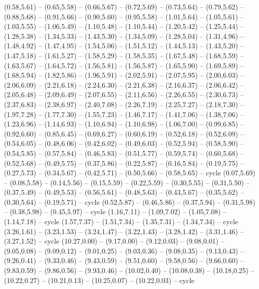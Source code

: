 \expandafter\def\csname geo:gebiet:heute-NLD\endcsname{
  (0.58,5.61) -- (0.65,5.58) -- (0.66,5.67) -- (0.72,5.69) -- (0.73,5.64) -- (0.79,5.62) -- (0.88,5.68) -- (0.91,5.66) -- (0.90,5.60) -- (0.95,5.58) -- (1.01,5.64) -- (1.05,5.61) -- (1.03,5.55) -- (1.06,5.49) -- (1.10,5.48) -- (1.10,5.44) -- (1.20,5.42) -- (1.25,5.44) -- (1.28,5.38) -- (1.34,5.33) -- (1.43,5.30) -- (1.34,5.09) -- (1.28,5.04) -- (1.31,4.96) -- (1.48,4.92) -- (1.47,4.95) -- (1.54,5.06) -- (1.51,5.12) -- (1.44,5.13) -- (1.43,5.20) -- (1.47,5.18) -- (1.61,5.27) -- (1.58,5.29) -- (1.58,5.35) -- (1.67,5.48) -- (1.68,5.59) -- (1.63,5.67) -- (1.64,5.72) -- (1.56,5.81) -- (1.56,5.87) -- (1.65,5.90) -- (1.69,5.89) -- (1.68,5.94) -- (1.82,5.86) -- (1.96,5.91) -- (2.02,5.91) -- (2.07,5.95) -- (2.00,6.03) -- (2.06,6.09) -- (2.21,6.18) -- (2.24,6.30) -- (2.21,6.38) -- (2.16,6.37) -- (2.06,6.42) -- (2.05,6.48) -- (2.09,6.49) -- (2.07,6.55) -- (2.11,6.56) -- (2.26,6.55) -- (2.30,6.73) -- (2.37,6.83) -- (2.38,6.97) -- (2.40,7.08) -- (2.26,7.19) -- (2.25,7.27) -- (2.18,7.30) -- (1.97,7.28) -- (1.77,7.30) -- (1.55,7.23) -- (1.46,7.17) -- (1.41,7.06) -- (1.38,7.06) -- (1.23,6.96) -- (1.14,6.93) -- (1.10,6.94) -- (1.10,6.98) -- (1.06,7.00) -- (0.99,6.85) -- (0.92,6.60) -- (0.85,6.45) -- (0.69,6.27) -- (0.60,6.19) -- (0.52,6.18) -- (0.52,6.09) -- (0.54,6.05) -- (0.48,6.06) -- (0.42,6.02) -- (0.49,6.03) -- (0.52,5.94) -- (0.58,5.90) -- (0.54,5.85) -- (0.57,5.84) -- (0.46,5.83) -- (0.51,5.77) -- (0.59,5.74) -- (0.60,5.68) -- (0.52,5.68) -- (0.49,5.75) -- (0.37,5.86) -- (0.22,5.87) -- (0.16,5.84) -- (0.19,5.75) -- (0.27,5.73) -- (0.34,5.67) -- (0.42,5.71) -- (0.50,5.66) -- (0.58,5.65) -- cycle
  (0.07,5.69) -- (0.08,5.58) -- (0.14,5.56) -- (0.15,5.59) -- (0.22,5.59) -- (0.30,5.55) -- (0.31,5.50) -- (0.37,5.49) -- (0.49,5.53) -- (0.56,5.61) -- (0.48,5.63) -- (0.43,5.67) -- (0.35,5.62) -- (0.30,5.64) -- (0.19,5.71) -- cycle
  (0.52,5.87) -- (0.46,5.86) -- (0.37,5.94) -- (0.31,5.98) -- (0.38,5.98) -- (0.45,5.97) -- cycle
  (1.16,7.11) -- (1.09,7.02) -- (1.05,7.08) -- (1.14,7.18) -- cycle
  (1.57,7.37) -- (1.51,7.34) -- (1.35,7.31) -- (1.34,7.34) -- cycle}
\expandafter\def\csname geo:gebiet:heute-LIE\endcsname{
  (3.26,1.61) -- (3.23,1.53) -- (3.24,1.47) -- (3.22,1.43) -- (3.28,1.42) -- (3.31,1.46) -- (3.27,1.52) -- cycle}
\expandafter\def\csname geo:gebiet:heute-SRB\endcsname{
  (10.27,0.00) -- (9.17,0.00) -- (9.12,0.03) -- (9.08,0.01) -- (9.05,0.08) -- (9.09,0.12) -- (9.01,0.25) -- (9.03,0.36) -- (9.08,0.35) -- (9.13,0.43) -- (9.26,0.41) -- (9.33,0.46) -- (9.43,0.59) -- (9.51,0.60) -- (9.58,0.56) -- (9.66,0.60) -- (9.83,0.59) -- (9.86,0.56) -- (9.93,0.46) -- (10.02,0.40) -- (10.08,0.38) -- (10.18,0.25) -- (10.22,0.27) -- (10.21,0.13) -- (10.25,0.07) -- (10.22,0.03) -- cycle}
